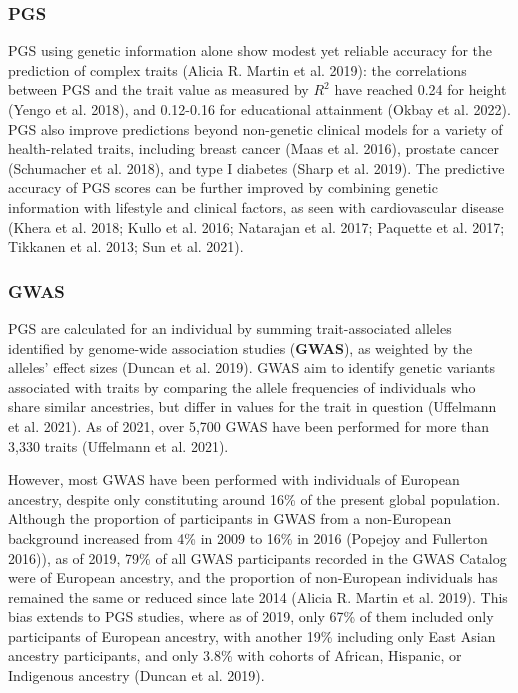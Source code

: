 \documentclass[
]{book}
\begin{document}
\hypertarget{pgs}{%
\subsubsection{PGS}\label{pgs}}

PGS using genetic information alone show modest yet reliable accuracy for the prediction of complex traits (Alicia R. Martin et al. 2019): the correlations between PGS and the trait value as measured by \(R^2\) have reached 0.24 for height (Yengo et al. 2018), and 0.12-0.16 for educational attainment (Okbay et al. 2022). PGS also improve predictions beyond non-genetic clinical models for a variety of health-related traits, including breast cancer (Maas et al. 2016), prostate cancer (Schumacher et al. 2018), and type I diabetes (Sharp et al. 2019). The predictive accuracy of PGS scores can be further improved by combining genetic information with lifestyle and clinical factors, as seen with cardiovascular disease (Khera et al. 2018; Kullo et al. 2016; Natarajan et al. 2017; Paquette et al. 2017; Tikkanen et al. 2013; Sun et al. 2021).

\hypertarget{gwas}{%
\subsubsection{GWAS}\label{gwas}}

PGS are calculated for an individual by summing trait-associated alleles identified by genome-wide association studies (\textbf{GWAS}), as weighted by the alleles' effect sizes (Duncan et al. 2019). GWAS aim to identify genetic variants associated with traits by comparing the allele frequencies of individuals who share similar ancestries, but differ in values for the trait in question (Uffelmann et al. 2021). As of 2021, over 5,700 GWAS have been performed for more than 3,330 traits (Uffelmann et al. 2021).

However, most GWAS have been performed with individuals of European ancestry, despite only constituting around 16\% of the present global population. Although the proportion of participants in GWAS from a non-European background increased from 4\% in 2009 to 16\% in 2016 (Popejoy and Fullerton 2016)), as of 2019, 79\% of all GWAS participants recorded in the GWAS Catalog were of European ancestry, and the proportion of non-European individuals has remained the same or reduced since late 2014 (Alicia R. Martin et al. 2019). This bias extends to PGS studies, where as of 2019, only 67\% of them included only participants of European ancestry, with another 19\% including only East Asian ancestry participants, and only 3.8\% with cohorts of African, Hispanic, or Indigenous ancestry (Duncan et al. 2019).
\end{document}
